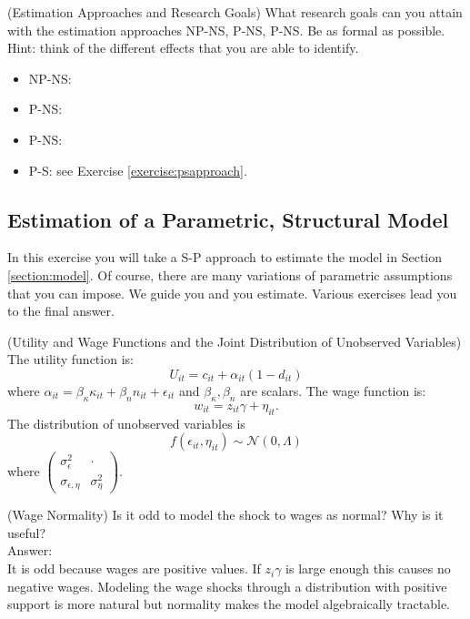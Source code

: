 \begin{exercise} (Estimation Approaches and Research Goals) \label{exercise:approaches}
What research goals can you attain with the estimation approaches NP-NS, P-NS, P-NS. Be as formal as possible. Hint: think of the different effects that you are able to identify.
\begin{itemize}
\item NP-NS: 
\item P-NS:
\item P-NS:
\item P-S: see Exercise \ref{exercise:psapproach}.
\end{itemize}
\end{exercise}

\subsection{Estimation of a Parametric, Structural Model}
In this exercise you will take a S-P approach to estimate the model in Section \ref{section:model}. Of course, there are many variations of parametric assumptions that you can impose. We guide you and you estimate. Various exercises lead you to the final answer. 

\begin{assumption} (Utility and Wage Functions and the Joint Distribution of Unobserved Variables) \label{assumption:utwajo}
The utility function is:
\begin{equation}
U_{it} = c_{it} + \alpha_{it} (1 - d_{it})
\end{equation}
\noindent where $\alpha_{it} = \beta_{\kappa} \kappa_{it} + \beta_{n} n_{it} + \epsilon_{it}$ and $\beta_{\kappa},\beta_{n}$ are scalars. The wage function is:
\begin{equation}
w_{it} = z_{it} \gamma + \eta_{it}.
\end{equation}
\noindent The distribution of unobserved variables is
\begin{equation}
f \left( \epsilon_{it}, \eta_{it} \right) \sim \mathcal{N} \left( 0, \Lambda \right)
\end{equation}
where $\left( \begin{array}{cc} 
\sigma_{\epsilon}^2 & \cdot \\
\sigma_{\epsilon, \eta} & \sigma_{\eta}^2
\end{array} \right)$.  
\end{assumption}

\begin{exercise} (Wage Normality)
Is it odd to model the shock to wages as normal? Why is it useful?\\
\noindent Answer:\\
\noindent It is odd because wages are positive values. If $z_{i} \gamma$ is large enough this causes no negative wages. Modeling the wage shocks through a distribution with positive support is more natural but normality makes the model algebraically tractable. 
\end{exercise}

